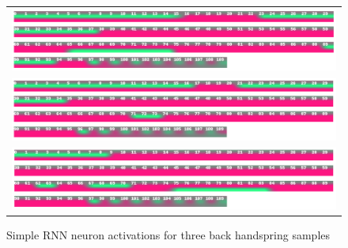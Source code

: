\begin{figure}
   \centering
\begin{tabular}{c}
\includegraphics[width=\textwidth]{images/classifier/neuron-activations-simple-rnn-model-3/flack-19-rasmus}\\
\includegraphics[width=\textwidth]{images/classifier/neuron-activations-simple-rnn-model-3/flack-31-rasmus}\\
\includegraphics[width=\textwidth]{images/classifier/neuron-activations-simple-rnn-model-3/flack-55-martin}\\
\end{tabular}
    \caption{Simple RNN neuron activations for three back handspring samples}
    \label{back-handspring-neuron-activations-simple-rnn}
\end{figure}

